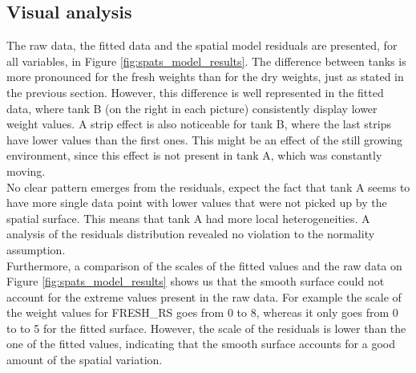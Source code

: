 \subsection{Visual analysis}
The raw data, the fitted data and the spatial model residuals are presented, for all variables, in Figure \ref{fig:spats_model_results}. The difference between tanks is more pronounced for the fresh weights than for the dry weights, just as stated in the previous section. However, this difference is well represented in the fitted data, where tank B (on the right in each picture) consistently display lower weight values. A strip effect is also noticeable for tank B, where the last strips have lower values than the first ones. This might be an effect of the still growing environment, since this effect is not present in tank A, which was constantly moving.\\

No clear pattern emerges from the residuals, expect the fact that tank A seems to have more single data point with lower values that were not picked up by the spatial surface. This means that tank A had more local heterogeneities. A analysis of the residuals distribution revealed no violation to the normality assumption.\\

Furthermore, a comparison of the scales of the fitted values and the raw data on Figure \ref{fig:spats_model_results} shows us that the smooth surface could not account for the extreme values present in the raw data. For example the scale of the weight values for FRESH\_RS goes from 0 to 8, whereas it only goes from 0 to to 5 for the fitted surface. However, the scale of the residuals is lower than the one of the fitted values, indicating that the smooth surface accounts for a good amount of the spatial variation.

